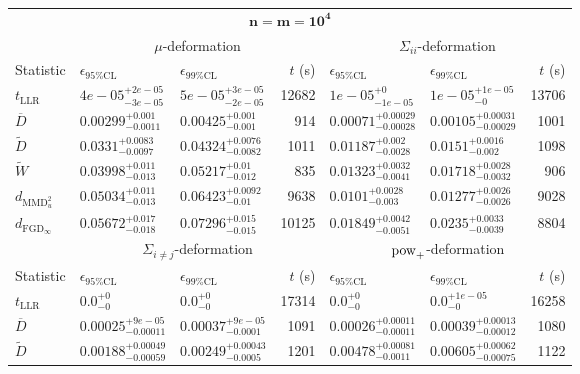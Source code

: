 \begin{tabular}{l|llr|llr}
	\toprule
	\multicolumn{7}{c}{$\mathbf{n=m=10^{4}}$} \\
	\multicolumn{1}{c}{} & \multicolumn{3}{c}{$\mu$-deformation} & \multicolumn{3}{c}{$\Sigma_{ii}$-deformation} \\
	Statistic & $\epsilon_{95\%\mathrm{CL}}$ & $\epsilon_{99\%\mathrm{CL}}$ & $t$ (s) & $\epsilon_{95\%\mathrm{CL}}$ & $\epsilon_{99\%\mathrm{CL}}$ & $t$ (s) \\
	\midrule
	$t_{\mathrm{LLR}}$ & $4e-05_{-3e-05}^{+2e-05}$ & $5e-05_{-2e-05}^{+3e-05}$ & 12682 & $1e-05_{-1e-05}^{+0}$ & $1e-05_{-0}^{+1e-05}$ & 13706 \\
	$\overline{D}$ & $0.00299_{-0.0011}^{+0.001}$ & $0.00425_{-0.001}^{+0.001}$ & 914 & $0.00071_{-0.00028}^{+0.00029}$ & $0.00105_{-0.00029}^{+0.00031}$ & 1001 \\
	$\widetilde{D}$ & $0.0331_{-0.0097}^{+0.0083}$ & $0.04324_{-0.0082}^{+0.0076}$ & 1011 & $0.01187_{-0.0028}^{+0.002}$ & $0.0151_{-0.002}^{+0.0016}$ & 1098 \\
	$\widetilde{W}$ & $0.03998_{-0.013}^{+0.011}$ & $0.05217_{-0.012}^{+0.01}$ & 835 & $0.01323_{-0.0041}^{+0.0032}$ & $0.01718_{-0.0032}^{+0.0028}$ & 906 \\
	$d_{\mathrm{MMD}^{2}_{u}}$ & $0.05034_{-0.013}^{+0.011}$ & $0.06423_{-0.01}^{+0.0092}$ & 9638 & $0.0101_{-0.003}^{+0.0028}$ & $0.01277_{-0.0026}^{+0.0026}$ & 9028 \\
	$d_{\mathrm{FGD}_{\infty}}$ & $0.05672_{-0.018}^{+0.017}$ & $0.07296_{-0.015}^{+0.015}$ & 10125 & $0.01849_{-0.0051}^{+0.0042}$ & $0.0235_{-0.0039}^{+0.0033}$ & 8804 \\
	\toprule
	\multicolumn{1}{c}{} & \multicolumn{3}{c}{$\Sigma_{i\neq j}$-deformation} & \multicolumn{3}{c}{$\rm{pow}_{+}$-deformation} \\
	Statistic & $\epsilon_{95\%\mathrm{CL}}$ & $\epsilon_{99\%\mathrm{CL}}$ & $t$ (s) & $\epsilon_{95\%\mathrm{CL}}$ & $\epsilon_{99\%\mathrm{CL}}$ & $t$ (s) \\
	\midrule
	$t_{\mathrm{LLR}}$ & $0.0_{-0}^{+0}$ & $0.0_{-0}^{+0}$ & 17314 & $0.0_{-0}^{+0}$ & $0.0_{-0}^{+1e-05}$ & 16258 \\
	$\overline{D}$ & $0.00025_{-0.00011}^{+9e-05}$ & $0.00037_{-0.0001}^{+9e-05}$ & 1091 & $0.00026_{-0.00011}^{+0.00011}$ & $0.00039_{-0.00012}^{+0.00013}$ & 1080 \\
	$\widetilde{D}$ & $0.00188_{-0.00059}^{+0.00049}$ & $0.00249_{-0.0005}^{+0.00043}$ & 1201 & $0.00478_{-0.0011}^{+0.00081}$ & $0.00605_{-0.00075}^{+0.00062}$ & 1122 \\

\end{tabular}
